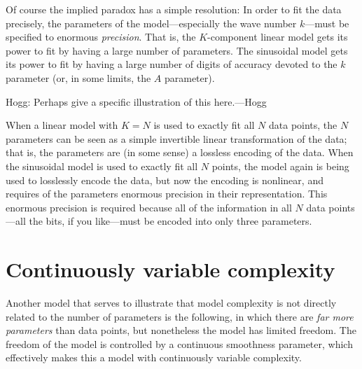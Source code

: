 \documentclass[12pt,twoside]{article}
\begin{document}
Of course the implied paradox has a simple resolution: In order to fit
the data precisely, the parameters of the model---especially the wave
number $k$---must be specified to enormous \emph{precision}.  That is,
the $K$-component linear model gets its power to fit by having a large
number of parameters.  The sinusoidal model gets its power to fit by
having a large number of digits of accuracy devoted to the $k$
parameter (or, in some limits, the $A$ parameter).

Hogg:  Perhaps give a specific illustration of this here.---Hogg

When a linear model with $K=N$ is used to exactly fit all $N$ data
points, the $N$ parameters can be seen as a simple invertible linear
transformation of the data; that is, the parameters are (in some
sense) a lossless encoding of the data.  When the sinusoidal model is
used to exactly fit all $N$ points, the model again is being used to
losslessly encode the data, but now the encoding is nonlinear, and
requires of the parameters enormous precision in their representation.
This enormous precision is required because all of the information in
all $N$ data points---all the bits, if you like---must be encoded into
only three parameters.

\section{Continuously variable complexity}

Another model that serves to illustrate that model complexity is not
directly related to the number of parameters is the following, in
which there are \emph{far more parameters} than data points, but
nonetheless the model has limited freedom.  The freedom of the model
is controlled by a continuous smoothness parameter, which effectively
makes this a model with continuously variable complexity.
\end{document}
